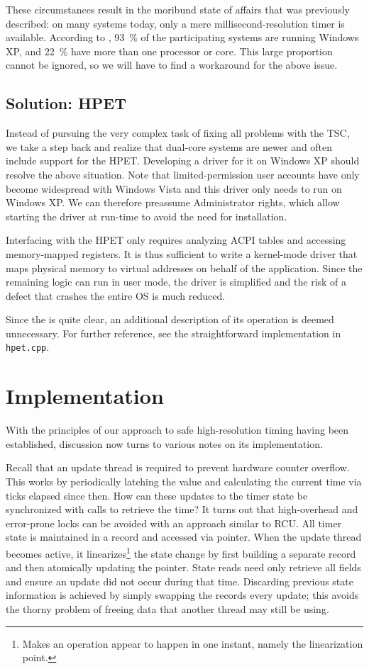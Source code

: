 \documentclass[a4paper,12pt,pdftex]{article}
\newcommand{\id}[1]{\texttt{#1}}
\begin{document}
These circumstances result in the moribund state of affairs that was previously described: on many systems today, only a mere millisecond-resolution timer is available. According to \citet{valveSurvey}, 93~\% of the participating systems are running Windows XP, and 22~\% have more than one processor or core. This large proportion cannot be ignored, so we will have to find a workaround for the above issue.

\subsection{Solution: HPET}

Instead of pursuing the very complex task of fixing all problems with the TSC, we take a step back and realize that dual-core systems are newer and often include support for the HPET. Developing a driver for it on Windows XP should resolve the above situation. Note that limited-permission user accounts have only become widespread with Windows Vista and this driver only needs to run on Windows XP. We can therefore preassume Administrator rights, which allow starting the driver at run-time to avoid the need for installation.

Interfacing with the HPET only requires analyzing ACPI tables and accessing memory-mapped registers. It is thus sufficient to write a kernel-mode driver that maps physical memory to virtual addresses on behalf of the application. Since the remaining logic can run in user mode, the driver is simplified and the risk of a defect that crashes the entire OS is much reduced.

\pagebreak
Since the \citet{hpetSpec} is quite clear, an additional description of its operation is deemed unnecessary. For further reference, see the straightforward implementation in \id{hpet.cpp}.

\section{Implementation}
\label{sec:implementation}

With the principles of our approach to safe high-resolution timing having been established, discussion now turns to various notes on its implementation.

Recall that an update thread is required to prevent hardware counter overflow. This works by periodically latching the value and calculating the current time via ticks elapsed since then. How can these updates to the timer state be synchronized with calls to retrieve the time? It turns out that high-overhead and error-prone locks can be avoided with an approach similar to RCU. \citep{RCU} All timer state is maintained in a record and accessed via pointer. When the update thread becomes active, it linearizes\footnote{Makes an operation appear to happen in one instant, namely the linearization point.} the state change by first building a separate record and then atomically updating the pointer. State reads need only retrieve all fields and ensure an update did not occur during that time. Discarding previous state information is achieved by simply swapping the records every update; this avoids the thorny problem of freeing data that another thread may still be using.
\end{document}
